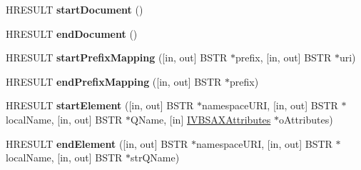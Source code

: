 \begin{DoxyCompactItemize}
\item 
\mbox{\label{interface_m_s_x_m_l2_1_1_i_v_b_s_a_x_content_handler_a67db42d558655301b6a03a09e46c5174}} 
H\+R\+E\+S\+U\+LT {\bfseries start\+Document} ()
\item 
\mbox{\label{interface_m_s_x_m_l2_1_1_i_v_b_s_a_x_content_handler_a6842da9db003a4dc4baf76ac9760e700}} 
H\+R\+E\+S\+U\+LT {\bfseries end\+Document} ()
\item 
\mbox{\label{interface_m_s_x_m_l2_1_1_i_v_b_s_a_x_content_handler_affe4ce1e3b99e524f610cae1aa302a47}} 
H\+R\+E\+S\+U\+LT {\bfseries start\+Prefix\+Mapping} (\mbox{[}in, out\mbox{]} B\+S\+TR $\ast$prefix, \mbox{[}in, out\mbox{]} B\+S\+TR $\ast$uri)
\item 
\mbox{\label{interface_m_s_x_m_l2_1_1_i_v_b_s_a_x_content_handler_a53ae8b71dd21d0173cf4a5bf17ef6f2b}} 
H\+R\+E\+S\+U\+LT {\bfseries end\+Prefix\+Mapping} (\mbox{[}in, out\mbox{]} B\+S\+TR $\ast$prefix)
\item 
\mbox{\label{interface_m_s_x_m_l2_1_1_i_v_b_s_a_x_content_handler_a3db75f80da1c1de65facd33e078955ed}} 
H\+R\+E\+S\+U\+LT {\bfseries start\+Element} (\mbox{[}in, out\mbox{]} B\+S\+TR $\ast$namespace\+U\+RI, \mbox{[}in, out\mbox{]} B\+S\+TR $\ast$local\+Name, \mbox{[}in, out\mbox{]} B\+S\+TR $\ast$Q\+Name, \mbox{[}in\mbox{]} \hyperlink{interface_m_s_x_m_l2_1_1_i_v_b_s_a_x_attributes}{I\+V\+B\+S\+A\+X\+Attributes} $\ast$o\+Attributes)
\item 
\mbox{\label{interface_m_s_x_m_l2_1_1_i_v_b_s_a_x_content_handler_ad037e4ae64fa050242b3178395bc050d}} 
H\+R\+E\+S\+U\+LT {\bfseries end\+Element} (\mbox{[}in, out\mbox{]} B\+S\+TR $\ast$namespace\+U\+RI, \mbox{[}in, out\mbox{]} B\+S\+TR $\ast$local\+Name, \mbox{[}in, out\mbox{]} B\+S\+TR $\ast$str\+Q\+Name)
\item 
\mbox{\label{interface_m_s_x_m_l2_1_1_i_v_b_s_a_x_content_handler_a90bdf5ab404e5e47679c4d766538e28e}} 

\end{DoxyCompactItemize}
